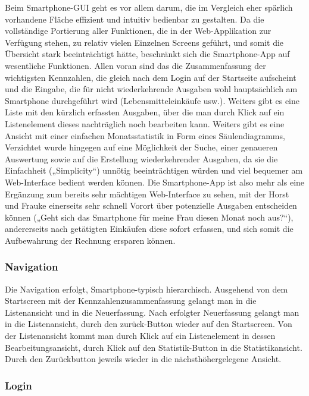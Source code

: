 Beim Smartphone-GUI geht es vor allem darum, die im Vergleich eher spärlich vorhandene Fläche effizient und intuitiv bedienbar zu gestalten. Da die vollständige Portierung aller Funktionen, die in der Web-Applikation zur Verfügung stehen, zu relativ vielen Einzelnen Screens geführt, und somit die Übersicht stark beeinträchtigt hätte, beschränkt sich die Smartphone-App auf wesentliche Funktionen. Allen voran sind das die Zusammenfassung der wichtigsten Kennzahlen, die gleich nach dem Login auf der Startseite aufscheint und die Eingabe, die für nicht wiederkehrende Ausgaben wohl hauptsächlich am Smartphone durchgeführt wird (Lebensmitteleinkäufe usw.). Weiters gibt es eine Liste mit den kürzlich erfassten Ausgaben, über die man durch Klick auf ein Listenelement dieses nachträglich noch bearbeiten kann. Weiters gibt es eine Ansicht mit einer einfachen Monatsstatistik in Form eines Säulendiagramms,
Verzichtet wurde hingegen auf eine Möglichkeit der Suche, einer genaueren Auswertung sowie auf die Erstellung wiederkehrender Ausgaben, da sie die Einfachheit („Simplicity“) unnötig beeinträchtigen würden und viel bequemer am Web-Interface bedient werden können. Die Smartphone-App ist also mehr als eine Ergänzung zum bereits sehr mächtigen Web-Interface zu sehen, mit der Horst und Frauke einerseits sehr schnell Vorort über potenzielle Ausgaben entscheiden können („Geht sich das Smartphone für meine Frau diesen Monat noch aus?“), andererseits nach getätigten Einkäufen diese sofort erfassen, und sich somit die Aufbewahrung der Rechnung ersparen können.

\subsubsection{Navigation}

Die Navigation erfolgt, Smartphone-typisch hierarchisch. Ausgehend von dem Startscreen mit der Kennzahlenzusammenfassung gelangt man in die Listenansicht und in die Neuerfassung. Nach erfolgter Neuerfassung gelangt man in die Listenansicht, durch den zur\"uck-Button wieder auf den Startscreen. Von der Listenansicht kommt man durch Klick auf ein Listenelement in dessen Bearbeitungsansicht, durch Klick auf den Statistik-Button in die Statistikansicht. Durch den Zur\"uckbutton jeweils wieder in die n\"achsth\"ohergelegene Ansicht.

\subsubsection{Login}

